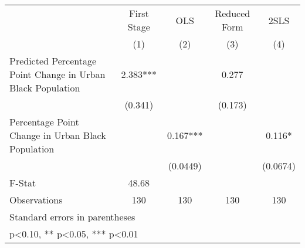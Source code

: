 {
\def\sym#1{\ifmmode^{#1}\else\(^{#1}\)\fi}
\begin{tabular}{l*{4}{c}}
\toprule
                    & First Stage   &         OLS   &Reduced Form   &        2SLS   \\
                    &\multicolumn{1}{c}{(1)}   &\multicolumn{1}{c}{(2)}   &\multicolumn{1}{c}{(3)}   &\multicolumn{1}{c}{(4)}   \\
\midrule
Predicted Percentage Point Change in Urban Black Population&       2.383***&               &       0.277   &               \\
                    &     (0.341)   &               &     (0.173)   &               \\
\addlinespace
Percentage Point Change in Urban Black Population&               &       0.167***&               &       0.116*  \\
                    &               &    (0.0449)   &               &    (0.0674)   \\
\midrule
F-Stat              &       48.68   &               &               &               \\
Observations        &         130   &         130   &         130   &         130   \\
\bottomrule
\multicolumn{5}{l}{\footnotesize Standard errors in parentheses}\\
\multicolumn{5}{l}{\footnotesize * p<0.10, ** p<0.05, *** p<0.01}\\
\end{tabular}
}
